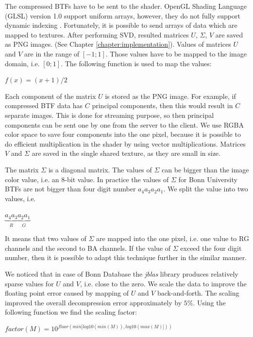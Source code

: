  
The compressed BTFs  have to be sent to the shader. 
  OpenGL Shading Language (GLSL) version 1.0 support uniform arrays, however, they do not fully support dynamic indexing  \cite{glsl}.
Fortunately, it is possible to send arrays of data which are mapped to textures. 
After performing SVD, resulted matrices $U$, $\Sigma$, $V$ are saved as PNG images. (See Chapter \ref{chapter:implementation}).
Values of matrices $U$ and $V$ are in the range of $[-1;1]$.
 Those values have to be mapped to the image domain, i.e. $[0;1]$.
The following function is used to map the values:  

{\centering$f(x)=(x+1)/2$\\}


 Each component of the matrix $U$ is stored as the PNG image.
 For example, if compressed BTF data has $C$ principal components, then this would result in $C$ separate images.
 This is done for streaming purpose, so then principal components can be sent one by one from the server to the client.
 We use  RGBA color space to save four components into the one pixel, because it is possible to do efficient multiplication in the shader by using vector multiplications.
Matrices $V$ and $\Sigma$ are saved in the single shared texture, as they are small in size.

 The matrix $\Sigma$ is a diagonal matrix.
 The values of $\Sigma$ can be bigger than the image color value, i.e. an 8-bit value.
 In practice the values of $\Sigma$ for Bonn University BTFs \cite{btfBonn} are not bigger than four digit number $a_{4}a_{3}a_{2}a_{1}$.
We split the value into two values, i.e. 
 
{\centering$ \underbrace{a_{4}a_{3}}_{R} \underbrace{a_{2}a_{1}}_{G}$\\}
 
It means that two values of $\Sigma$ are mapped into the one pixel, i.e.  one value to RG  channels and the second to BA channels.
If the value of  $\Sigma$ exceed the four digit number, then it is possible to adapt this technique further in the similar manner.


We noticed that in case of Bonn Database \cite{btfBonn} the \emph{jblas} \cite{jblas} library produces relatively sparse values for $U$ and $V$, i.e. close to the zero.
 We scale the data to improve the floating point error caused by mapping of $U$ and $V$ back-and-forth.
The scaling improved the overall decompression error approximately by $5\%$.
 Using the following function we find the scaling factor:
 
 {\centering$ factor(M)=10^{floor(min[log10(min(M)),log10(max(M)]))}$ \\}
 
